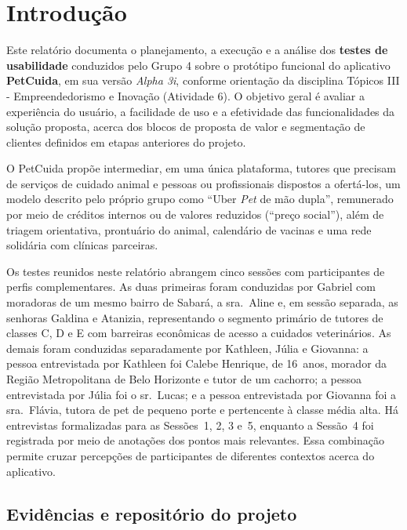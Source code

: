 \documentclass[
    12pt,
    openright,
    oneside,
    a4paper
]{abntex2}
\begin{document}
\tableofcontents
\listoffigures
\listoftables
\newpage

\chapter{Introdução}

Este relatório documenta o planejamento, a execução e a análise dos \textbf{testes de
usabilidade} conduzidos pelo Grupo 4 sobre o protótipo funcional do aplicativo
\textbf{PetCuida}, em sua versão \textit{Alpha 3i}, conforme orientação da disciplina Tópicos
III - Empreendedorismo e Inovação (Atividade 6). O objetivo geral é avaliar a experiência do
usuário, a facilidade de uso e a efetividade das funcionalidades da solução proposta, acerca
dos blocos de proposta de valor e segmentação de clientes definidos em etapas anteriores do
projeto.

O PetCuida propõe intermediar, em uma única plataforma, tutores que precisam de serviços de
cuidado animal e pessoas ou profissionais dispostos a ofertá-los, um modelo descrito pelo
próprio grupo como \enquote{Uber \textit{Pet} de mão dupla}, remunerado por meio de
créditos internos ou de valores reduzidos (\enquote{preço social}), além de triagem
orientativa, prontuário do animal, calendário de vacinas e uma rede solidária com clínicas
parceiras.

Os testes reunidos neste relatório abrangem cinco sessões com participantes de perfis
complementares. As duas primeiras foram conduzidas por Gabriel com moradoras de um mesmo
bairro de Sabará, a sra.~Aline e, em sessão separada, as senhoras Galdina e
Atanizia, representando o segmento primário de tutores de classes C, D e E com barreiras
econômicas de acesso a cuidados veterinários. As demais foram conduzidas separadamente por
Kathleen, Júlia e Giovanna: a pessoa entrevistada por Kathleen foi Calebe Henrique, de
16~anos, morador da Região Metropolitana de Belo Horizonte e tutor de um cachorro; a
pessoa entrevistada por Júlia foi o sr.~Lucas; e a pessoa entrevistada por Giovanna foi a
sra.~Flávia, tutora de pet de pequeno porte e pertencente à classe média alta. Há entrevistas
formalizadas para as Sessões~1, 2, 3 e~5, enquanto a Sessão~4 foi registrada por meio de
anotações dos pontos mais relevantes. Essa combinação permite cruzar percepções de
participantes de diferentes contextos acerca do aplicativo.

\section{Evidências e repositório do projeto}
\end{document}

